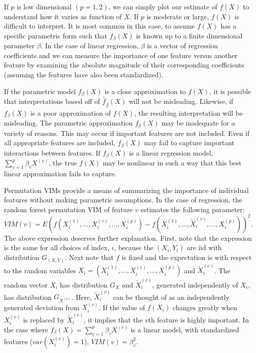 \documentclass[article,shortnames]{jss}
\begin{document}
If $p$ is low dimensional $(p=1,2)$, we can simply plot our estimate of $f(X)$ to understand how it varies as function of $X$. 
If $p$ is moderate or large, $f(X)$ is difficult to interpret.  It is most common in this case, to assume $f(X)$ has a specific parametric
form such that $f_{\beta}(X)$ is known up to a finite dimensional parameter $\beta$.  In the case of linear regression, 
$\beta$ is a vector of regression coefficients and we can measure the importance of one feature versus another feature by examining the absolute magnitude 
of their corresponding coefficients (assuming the features have also been standardized).    

If the parametric model $f_{\beta}(X)$ is a close approximation to $f(X)$, it is possible that interpretations based off of $\hat{f}_{\hat{\beta}}(X)$
will not be misleading.  Likewise, if $f_{\beta}(X)$ is a poor approximation of $f(X)$, the resulting interpretation will be misleading.  
The parametric approximation $f_{\beta}(X)$ may be inadequate for a variety of reasons.  This may occur if important features are 
not included.  Even if all appropriate features are included, $f_{\beta}(X)$ may fail to capture important interactions between features.
If $f_{\beta}(X)$ is a linear regression model, $\sum_{v=1}^{p}\beta_{v}X^{(v)}$, the true $f(X)$ may be nonlinear in such a way that this best linear approximation fails to capture.
  
Permutation VIMs provide a means of summarizing the importance of individual features without making parametric assumptions.
In the case of regression, the random forest permutation VIM of feature $v$ estimates the following parameter: 
\begin{equation}
VIM(v)=E(f(X^{(1)}_{i},\ldots,X^{(v)}_{i},\ldots,X^{(p)}_{i}) - f(X^{(1)}_{i},\ldots,\tilde{X}^{(v)}_{i},\ldots,X^{(p)}_{i}))^{2}.
\end{equation}
The above expression deserves further explanation.  First, note that the expression is the same for 
all choices of index, $i$, because the $(X_{i}, Y_{i})$ are iid with distribution $G_{(X,Y)}$.   
Next note that $f$ is fixed and the expectation is with respect to the random variables $X_{i}=(X^{(1)}_{i},\ldots,X^{(v)}_{i},\ldots,X^{(p)}_{i})$
and $\tilde{X}^{(v)}_{i}$.  The random vector $X_{i}$ has distribution $G_{X}$ and $\tilde{X}^{(v)}_{i}$, generated independently of $X_{i}$, has 
distribution $G_{X^{(v)}}$.  Here, $\tilde{X}^{(v)}_{i}$ can be thought of as an independently generated deviation from $X^{(v)}_{i}$.
If the value of $f(X_{i})$ changes greatly when $X^{(v)}_{i}$ is replaced by $\tilde{X}^{(v)}_{i}$, it implies that the $v$th feature is highly important.
In the case where $f_{\beta}(X)=\sum_{v=1}^{p}\beta_{v}X^{(v)}$ is a linear model, with standardized features ($var(X^{(v)}_{i})=1$), 
$VIM(v)=\beta_{v}^{2}$.
\end{document}
